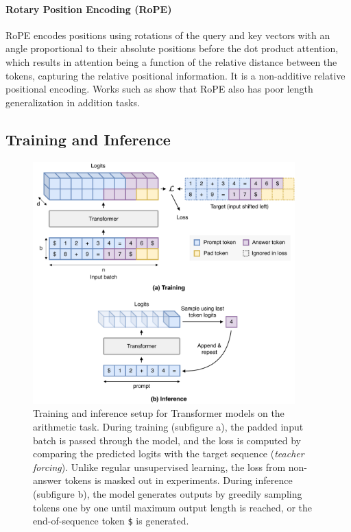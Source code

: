 \paragraph{Rotary Position Encoding (RoPE)}\label{subsec:rope}
RoPE \cite{su_roformer_2024} encodes positions using rotations of the query and key vectors with an angle proportional to their absolute positions before the dot product attention, which results in attention being a function of the relative distance between the tokens, capturing the relative positional information. It is a non-additive relative positional encoding. Works such as \cite{press_train_2021,kazemnejad_impact_2023} show that RoPE also has poor length generalization in addition tasks.

\subsection{Training and Inference}\label{subsec:training_inference}

\begin{figure}[h!]
    \centering
    \includegraphics[width=0.9\textwidth]{fig/training_and_inference.pdf}
    \caption{Training and inference setup for Transformer models on the arithmetic task. During training (subfigure a), the padded input batch is passed through the model, and the loss is computed by comparing the predicted logits with the target sequence (\emph{teacher forcing}). Unlike regular unsupervised learning, the loss from non-answer tokens is masked out in experiments. During inference (subfigure b), the model generates outputs by greedily sampling tokens one by one until maximum output length is reached, or the end-of-sequence token \texttt{\$} is generated.}
    \label{fig:transformer_training_inference}
\end{figure}

